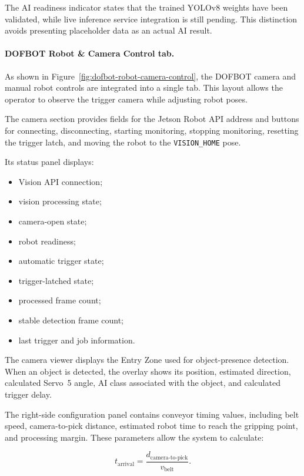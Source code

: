 The AI readiness indicator states that the trained YOLOv8 weights have been validated, while live inference service integration is still pending. This distinction avoids presenting placeholder data as an actual AI result.

\paragraph{DOFBOT Robot \& Camera Control tab.}
As shown in Figure~\ref{fig:dofbot-robot-camera-control}, the DOFBOT camera and manual robot controls are integrated into a single tab. This layout allows the operator to observe the trigger camera while adjusting robot poses.

The camera section provides fields for the Jetson Robot API address and buttons for connecting, disconnecting, starting monitoring, stopping monitoring, resetting the trigger latch, and moving the robot to the \texttt{VISION\_HOME} pose.

Its status panel displays:

\begin{itemize}
    \item Vision API connection;
    \item vision processing state;
    \item camera-open state;
    \item robot readiness;
    \item automatic trigger state;
    \item trigger-latched state;
    \item processed frame count;
    \item stable detection frame count;
    \item last trigger and job information.
\end{itemize}

The camera viewer displays the Entry Zone used for object-presence detection. When an object is detected, the overlay shows its position, estimated direction, calculated Servo~5 angle, AI class associated with the object, and calculated trigger delay.

The right-side configuration panel contains conveyor timing values, including belt speed, camera-to-pick distance, estimated robot time to reach the gripping point, and processing margin. These parameters allow the system to calculate:

\begin{equation}
    t_{\mathrm{arrival}} = \frac{d_{\mathrm{camera\text{-}to\text{-}pick}}}{v_{\mathrm{belt}}}.
    \label{eq:arrival-time}
\end{equation}

